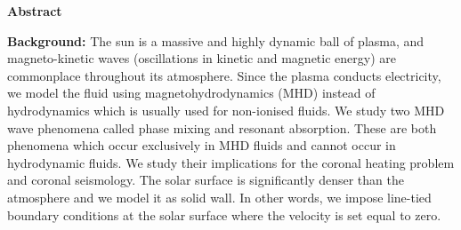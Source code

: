 \thispagestyle{plain}
\begin{center}
    
    
    
    \textbf{Abstract}
\end{center}

\begin{spacing}{1.1}

\noindent 

\textbf{Background:} 
The sun is a massive and highly dynamic ball of plasma, and magneto-kinetic waves (oscillations in kinetic and magnetic energy) are commonplace throughout its atmosphere. Since the plasma conducts electricity, we model the fluid using magnetohydrodynamics (MHD) instead of hydrodynamics which is usually used for non-ionised fluids. We study two MHD wave phenomena called phase mixing and resonant absorption. These are both phenomena which occur exclusively in MHD fluids and cannot occur in hydrodynamic fluids. We study their implications for the coronal heating problem and coronal seismology. The solar surface is significantly denser than the atmosphere and we model it as solid wall. In other words, we impose line-tied boundary conditions at the solar surface where the velocity is set equal to zero.


\end{spacing}
